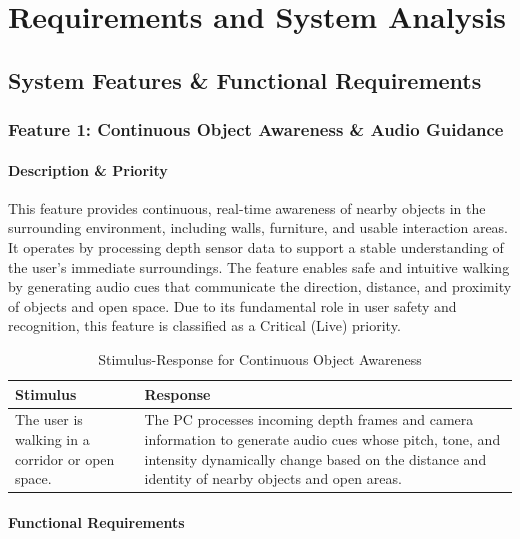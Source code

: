 \chapter{Requirements and System Analysis}

\section{System Features \& Functional Requirements}

\subsection{Feature 1: Continuous Object Awareness \& Audio Guidance}

\subsubsection{Description \& Priority}

This feature provides continuous, real-time awareness of nearby objects in the surrounding environment, including walls, furniture, and usable interaction areas. It operates by processing depth sensor data to support a stable understanding of the user’s immediate surroundings. The feature enables safe and intuitive walking by generating audio cues that communicate the direction, distance, and proximity of objects and open space. Due to its fundamental role in user safety and recognition, this feature is classified as a Critical (Live) priority.

\begin{table}[H]
    \centering
    \begin{tabular}{|p{}|p{}|}
        \hline
        \textbf{Stimulus} & \textbf{Response} \\
        \hline
        The user is walking in a corridor or open space. &
        The PC processes incoming depth frames and camera information to generate audio cues whose pitch, tone, and intensity dynamically change based on the distance and identity of nearby objects and open areas. \\
        \hline
    \end{tabular}
    \caption{Stimulus-Response for Continuous Object Awareness}
\end{table}

\subsubsection{Functional Requirements}

